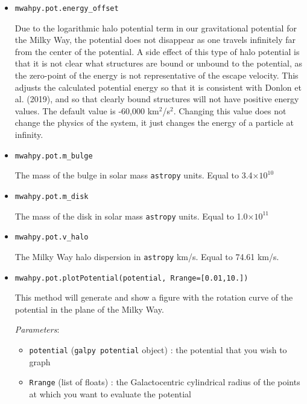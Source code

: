 \documentclass{article}
\begin{document}
\begin{itemize}

\item \verb!mwahpy.pot.energy_offset!

Due to the logarithmic halo potential term in our gravitational potential for the Milky Way, the potential does not disappear as one travels infinitely far from the center of the potential. A side effect of this type of halo potential is that it is not clear what structures are bound or unbound to the potential, as the zero-point of the energy is not representative of the escape velocity. This adjusts the calculated potential energy so that it is consistent with Donlon et al. (2019), and so that clearly bound structures will not have positive energy values. The default value is -60,000 km$^2$/s$^2$. Changing this value does not change the physics of the system, it just changes the energy of a particle at infinity. 

\item \verb!mwahpy.pot.m_bulge!

The mass of the bulge in solar mass \verb!astropy! units. Equal to 3.4$\times10^{10}$ \msol

\item \verb!mwahpy.pot.m_disk!

The mass of the disk in solar mass \verb!astropy! units. Equal to 1.0$\times10^{11}$ \msol

\item \verb!mwahpy.pot.v_halo!

The Milky Way halo dispersion in \verb!astropy! km/s. Equal to 74.61 km/s.

\item \verb!mwahpy.pot.plotPotential(potential, Rrange=[0.01,10.])!

This method will generate and show a figure with the rotation curve of the potential in the plane of the Milky Way. 

\textit{Parameters}: \begin{itemize}

\item \verb!potential! (\verb!galpy potential! object) : the potential that you wish to graph 

\item \verb!Rrange! (list of floats) : the Galactocentric cylindrical radius of the points at which you want to evaluate the potential

\end{itemize}


\end{itemize}
\end{document}
